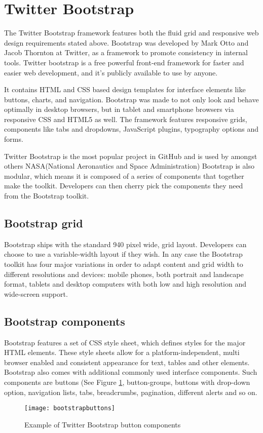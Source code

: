 \section{Twitter Bootstrap}
The Twitter Bootstrap framework\citep{twitterbootstrap} features both the fluid grid and responsive web design requirements stated above. Bootstrap was developed by Mark Otto and Jacob Thornton at Twitter, as a framework to promote consistency in internal tools\citep{buildingbootstrap}. Twitter bootstrap is a free powerful front-end framework for faster and easier web development, and it's publicly available to use by anyone.

It contains HTML and CSS based design templates for interface elements like buttons, charts, and navigation. Bootstrap was made to not only look and behave optimally in desktop browsers, but in tablet and smartphone browsers via responsive CSS and HTML5 as well. The framework features responsive grids, components like tabs and dropdowns, JavaScript plugins, typography options and forms. 

Twitter Bootstrap is the most popular project in GitHub and is used by amongst others NASA(National Aeronautics and Space Administration)\citep{nasa}
Bootstrap is also modular, which means it is composed of a series of components that together make the toolkit. Developers can then cherry pick the components they need from the Bootstrap toolkit. 


\subsection{Bootstrap grid}
Bootstrap ships with the standard 940 pixel wide, grid layout. Developers can choose to use a variable-width layout if they wish. In any case the Bootstrap toolkit has four major variations in order to adapt content and grid width to different resolutions and devices: mobile phones, both portrait and landscape format, tablets and desktop computers with both low and high resolution and wide-screen support.

\subsection{Bootstrap components}
Bootstrap features a set of CSS style sheet, which defines styles for the major HTML elements. These style sheets allow for a platform-independent, multi browser enabled and consistent appearance for text, tables and other elements. 
Bootstrap also comes with additional commonly used interface components. Such components are buttons (See Figure \ref{bootstrapbutton}, button-groups, buttons with drop-down option, navigation lists, tabs, breadcrumbs, pagination, different alerts and so on. 
\begin{figure}[H]
\centering
	\texttt{[image: bootstrapbuttons]}
\caption{Example of Twitter Bootstrap button components \citep{twitterbootstrap}}
\label{bootstrapbutton}
\end{figure}

